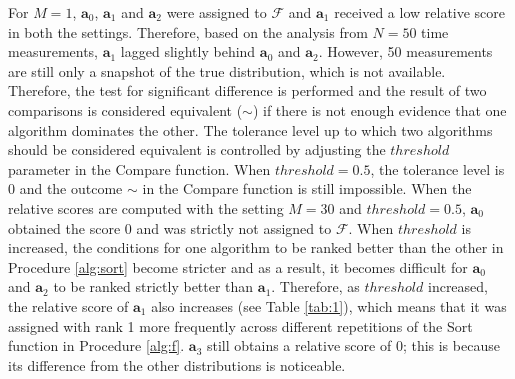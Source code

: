 \documentclass[conference]{IEEEtran}
\begin{document}
For $M=1$, $\mathbf{a}_0$, $\mathbf{a}_1$ and $\mathbf{a}_2$ were assigned to  $\mathcal{F}$ and $\mathbf{a}_1$ received a low relative score in both the settings. Therefore, based on the analysis from $N=50$ time measurements, $\mathbf{a}_1$ lagged slightly behind $\mathbf{a}_0$ and $\mathbf{a}_2$. However, 50 measurements are still only a snapshot of the true distribution, which is not available. Therefore, the test for significant
difference is performed and the result of two comparisons is considered equivalent ($\sim$) if there is not enough evidence
that one algorithm dominates the other. The tolerance level up to which two algorithms should be considered equivalent
is controlled by adjusting the $threshold$ parameter in the Compare function. When $threshold=0.5$, the tolerance level
is 0 and the outcome $\sim$ in the Compare function is still impossible. When the relative scores are computed with the
setting  $M=30$ and $threshold=0.5$, $\mathbf{a}_0$ obtained the score 0 and was strictly not assigned to $\mathcal{F}$.
When $threshold$ is increased, the conditions for one algorithm to be ranked better than the other in Procedure
\ref{alg:sort} become stricter and as a result, it becomes difficult for $\mathbf{a}_0$ and $\mathbf{a}_2$ to be ranked
strictly better than $\mathbf{a}_1$. Therefore, as $threshold$ increased, the relative score of $\mathbf{a}_1$ also
increases (see Table \ref{tab:1}), which means that it was assigned with rank 1 more frequently across different
repetitions of the Sort function in Procedure \ref{alg:f}. $\mathbf{a}_3$ still obtains a relative score of 0; this is
because its difference from the other distributions is noticeable.
\end{document}
